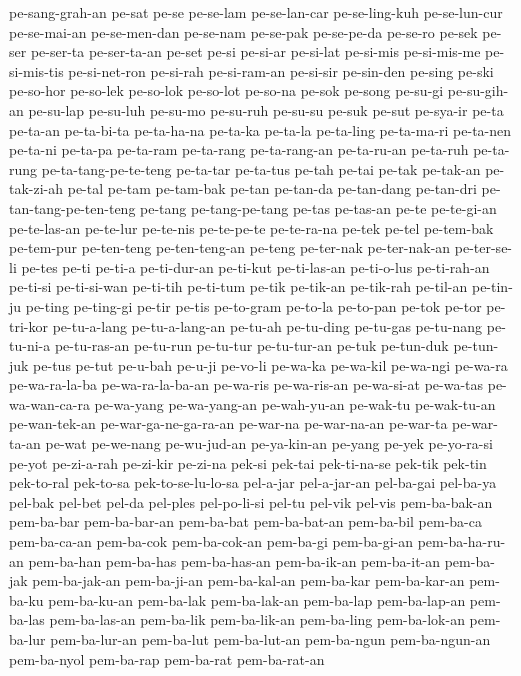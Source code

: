 {pe-sang-grah-an pe-sat pe-se pe-se-lam pe-se-lan-car pe-se-ling-kuh
pe-se-lun-cur pe-se-mai-an pe-se-men-dan pe-se-nam pe-se-pak pe-se-pe-da
pe-se-ro pe-sek pe-ser pe-ser-ta pe-ser-ta-an pe-set pe-si pe-si-ar
pe-si-lat pe-si-mis pe-si-mis-me pe-si-mis-tis pe-si-net-ron pe-si-rah
pe-si-ram-an pe-si-sir pe-sin-den pe-sing pe-ski pe-so-hor pe-so-lek
pe-so-lok pe-so-lot pe-so-na pe-sok pe-song pe-su-gi pe-su-gih-an
pe-su-lap pe-su-luh pe-su-mo pe-su-ruh pe-su-su pe-suk pe-sut pe-sya-ir
pe-ta pe-ta-an pe-ta-bi-ta pe-ta-ha-na pe-ta-ka pe-ta-la pe-ta-ling
pe-ta-ma-ri pe-ta-nen pe-ta-ni pe-ta-pa pe-ta-ram pe-ta-rang pe-ta-rang-an
pe-ta-ru-an pe-ta-ruh pe-ta-rung pe-ta-tang-pe-te-teng pe-ta-tar pe-ta-tus
pe-tah pe-tai pe-tak pe-tak-an pe-tak-zi-ah pe-tal pe-tam pe-tam-bak
pe-tan pe-tan-da pe-tan-dang pe-tan-dri pe-tan-tang-pe-ten-teng pe-tang
pe-tang-pe-tang pe-tas pe-tas-an pe-te pe-te-gi-an pe-te-las-an pe-te-lur
pe-te-nis pe-te-pe-te pe-te-ra-na pe-tek pe-tel pe-tem-bak pe-tem-pur
pe-ten-teng pe-ten-teng-an pe-teng pe-ter-nak pe-ter-nak-an pe-ter-se-li
pe-tes pe-ti pe-ti-a pe-ti-dur-an pe-ti-kut pe-ti-las-an pe-ti-o-lus
pe-ti-rah-an pe-ti-si pe-ti-si-wan pe-ti-tih pe-ti-tum pe-tik pe-tik-an
pe-tik-rah pe-til-an pe-tin-ju pe-ting pe-ting-gi pe-tir pe-tis pe-to-gram
pe-to-la pe-to-pan pe-tok pe-tor pe-tri-kor pe-tu-a-lang pe-tu-a-lang-an
pe-tu-ah pe-tu-ding pe-tu-gas pe-tu-nang pe-tu-ni-a pe-tu-ras-an pe-tu-run
pe-tu-tur pe-tu-tur-an pe-tuk pe-tun-duk pe-tun-juk pe-tus pe-tut pe-u-bah
pe-u-ji pe-vo-li pe-wa-ka pe-wa-kil pe-wa-ngi pe-wa-ra pe-wa-ra-la-ba
pe-wa-ra-la-ba-an pe-wa-ris pe-wa-ris-an pe-wa-si-at pe-wa-tas
pe-wa-wan-ca-ra pe-wa-yang pe-wa-yang-an pe-wah-yu-an pe-wak-tu
pe-wak-tu-an pe-wan-tek-an pe-war-ga-ne-ga-ra-an pe-war-na pe-war-na-an
pe-war-ta pe-war-ta-an pe-wat pe-we-nang pe-wu-jud-an pe-ya-kin-an pe-yang
pe-yek pe-yo-ra-si pe-yot pe-zi-a-rah pe-zi-kir pe-zi-na pek-si pek-tai
pek-ti-na-se pek-tik pek-tin pek-to-ral pek-to-sa pek-to-se-lu-lo-sa
pel-a-jar pel-a-jar-an pel-ba-gai pel-ba-ya pel-bak pel-bet pel-da
pel-ples pel-po-li-si pel-tu pel-vik pel-vis pem-ba-bak-an pem-ba-bar
pem-ba-bar-an pem-ba-bat pem-ba-bat-an pem-ba-bil pem-ba-ca pem-ba-ca-an
pem-ba-cok pem-ba-cok-an pem-ba-gi pem-ba-gi-an pem-ba-ha-ru-an pem-ba-han
pem-ba-has pem-ba-has-an pem-ba-ik-an pem-ba-it-an pem-ba-jak
pem-ba-jak-an pem-ba-ji-an pem-ba-kal-an pem-ba-kar pem-ba-kar-an
pem-ba-ku pem-ba-ku-an pem-ba-lak pem-ba-lak-an pem-ba-lap pem-ba-lap-an
pem-ba-las pem-ba-las-an pem-ba-lik pem-ba-lik-an pem-ba-ling
pem-ba-lok-an pem-ba-lur pem-ba-lur-an pem-ba-lut pem-ba-lut-an
pem-ba-ngun pem-ba-ngun-an pem-ba-nyol pem-ba-rap pem-ba-rat pem-ba-rat-an
}
